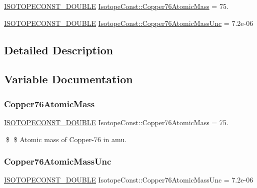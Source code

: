 \begin{DoxyCompactItemize}
\item 
\mbox{\hyperlink{group___isotope_const-_macros_ga8f45a7272ce02c0b4c65c44636ed719a}{I\+S\+O\+T\+O\+P\+E\+C\+O\+N\+S\+T\+\_\+\+D\+O\+U\+B\+LE}} \mbox{\hyperlink{group___isotope_const-_copper-_cu76_gaf0b6026430486496ae8b945ae2b054a6}{Isotope\+Const\+::\+Copper76\+Atomic\+Mass}} = 75.
\item 
\mbox{\hyperlink{group___isotope_const-_macros_ga8f45a7272ce02c0b4c65c44636ed719a}{I\+S\+O\+T\+O\+P\+E\+C\+O\+N\+S\+T\+\_\+\+D\+O\+U\+B\+LE}} \mbox{\hyperlink{group___isotope_const-_copper-_cu76_ga4ddba634d689e35229fc694badf140f2}{Isotope\+Const\+::\+Copper76\+Atomic\+Mass\+Unc}} = 7.\+2e-\/06
\end{DoxyCompactItemize}


\subsection{Detailed Description}


\subsection{Variable Documentation}
\mbox{\label{group___isotope_const-_copper-_cu76_gaf0b6026430486496ae8b945ae2b054a6}} 
\subsubsection{\texorpdfstring{Copper76\+Atomic\+Mass}{Copper76AtomicMass}}
{\footnotesize\ttfamily \mbox{\hyperlink{group___isotope_const-_macros_ga8f45a7272ce02c0b4c65c44636ed719a}{I\+S\+O\+T\+O\+P\+E\+C\+O\+N\+S\+T\+\_\+\+D\+O\+U\+B\+LE}} Isotope\+Const\+::\+Copper76\+Atomic\+Mass = 75.}

\$ \$ Atomic mass of Copper-\/76 in amu. \mbox{\label{group___isotope_const-_copper-_cu76_ga4ddba634d689e35229fc694badf140f2}} 
\subsubsection{\texorpdfstring{Copper76\+Atomic\+Mass\+Unc}{Copper76AtomicMassUnc}}
{\footnotesize\ttfamily \mbox{\hyperlink{group___isotope_const-_macros_ga8f45a7272ce02c0b4c65c44636ed719a}{I\+S\+O\+T\+O\+P\+E\+C\+O\+N\+S\+T\+\_\+\+D\+O\+U\+B\+LE}} Isotope\+Const\+::\+Copper76\+Atomic\+Mass\+Unc = 7.\+2e-\/06}

